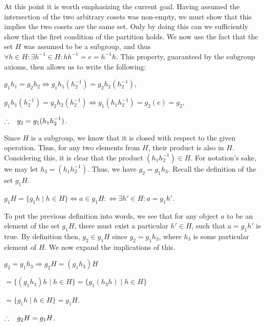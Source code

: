\documentclass[12pt, a4paper]{article}
\begin{document}
At this point it is worth emphasizing the current goal. Having assumed the intersection of the two arbitrary cosets was non-empty, we must show that this implies the two cosets are the same set. Only by doing this can we sufficiently show that the first condition of the partition holds. We now use the fact that the set $H$ was assumed to be a subgroup, and thus $\forall h\in H\colon\exists h^{-1}\in H\colon hh^{-1}=e=h^{-1}h$. This property, guaranteed by the subgroup axioms, then allows us to write the following:\hfill

\vspace{10mm}

\centerline{$g_1 h_1=g_2 h_2\Longleftrightarrow g_1 h_1 (h_2^{-1})=g_2 h_2 (h_2^{-1})$,}\hfill

\vspace{1mm}

\centerline{$g_1 h_1 (h_2^{-1})=g_2 h_2 (h_2^{-1})\Longleftrightarrow g_1 (h_1 h_2^{-1})=g_2 (e)=g_2$,}\hfill

\vspace{1mm}

\centerline{$\therefore\hspace{3mm} g_2=g_1 (h_1 h_2^{-1})$.}

\vspace{10mm}

Since $H$ is a subgroup, we know that it is closed with respect to the given operation. Thus, for any two elements from $H$, their product is also in $H$. Considering this, it is clear that the product $(h_1 h_2^{-1})\in H$. For notation's sake, we may let $h_3=(h_1 h_2^{-1})$. Thus, we have $g_2=g_1 h_3$. Recall the definition of the set $g_1 H$.

\vspace{10mm}

\centerline{$g_1 H=\{g_1 h\mid h\in H\}\Longleftrightarrow a\in g_1 H:\Leftrightarrow \exists h'\in H\colon a=g_1 h'$.}

\vspace{14mm}

To put the previous definition into words, we see that for any object $a$ to be an element of the set $g_1 H$, there must exist a particular $h'\in H$, such that $a=g_1 h'$ is true. By definition then, $g_2\in g_1 H$ since $g_2=g_1 h_3$, where $h_3$ is some particular element of $H$. We now expand the implications of this.

\vspace{10mm}

\centerline{$g_2=g_1 h_3\Longrightarrow g_2 H=(g_1 h_3)H$}\hfill
\vspace{1mm}
\centerline{$=\{(g_1 h_3)h\mid h\in H\}=\{g_1(h_3 h)\mid h\in H\}$}\hfill
\vspace{6mm}
\centerline{$=\{g_1 h\mid h\in H\}=g_1 H$.}\hfill
\vspace{6mm}
\centerline{$\therefore\hspace{3mm} g_2 H=g_1 H$.}
\end{document}
